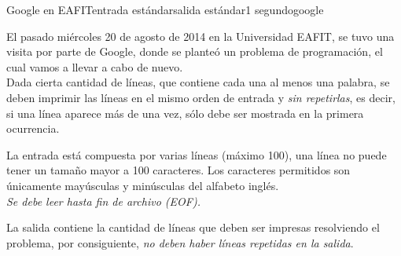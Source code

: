 \begin{problem}{Google en EAFIT}{entrada estándar}{salida estándar}{1 segundo}{google}

El pasado miércoles 20 de agosto de 2014 en la Universidad EAFIT, se tuvo una visita por parte de Google, donde se planteó un problema de programación, el cual vamos a llevar a cabo de nuevo.\\
\newline
Dada cierta cantidad de líneas, que contiene cada una al menos una palabra, se deben imprimir las líneas en el mismo orden de entrada y \emph{sin repetirlas}, es decir, si una línea aparece más de una vez, sólo debe ser mostrada en la primera ocurrencia.

\InputFile
La entrada está compuesta por varias líneas (máximo 100), una línea no puede tener un tamaño mayor a 100 caracteres. Los caracteres permitidos son únicamente mayúsculas y minúsculas del alfabeto inglés.\\
\textit{Se debe leer hasta fin de archivo (EOF).}

\OutputFile
La salida contiene la cantidad de líneas que deben ser impresas resolviendo el problema, por consiguiente, \emph{no deben haber líneas repetidas en la salida}.

\Example

\begin{example}
%
\end{example}

\end{problem}